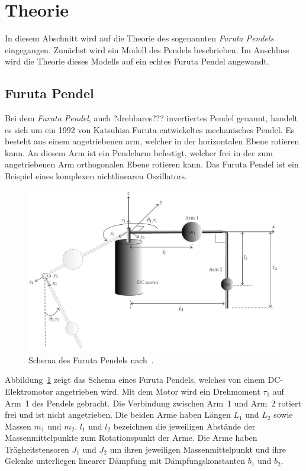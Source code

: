 \section{Theorie}
\label{sec.Theorie}
In diesem Abschnitt wird auf die Theorie des sogenannten \emph{Furuta Pendels} eingegangen. Zunächst wird ein Modell des Pendels beschrieben. Im Anschluss wird die Theorie dieses Modells auf ein echtes Furuta Pendel angewandt. %

\subsection{Furuta Pendel}
\label{sub.Furuta-Pendel}
Bei dem \emph{Furuta Pendel}, auch ?drehbares??? invertiertes Pendel genannt, handelt es sich um ein 1992 von Katsuhisa Furuta entwickeltes mechanisches Pendel. 
Es besteht aus einem angetriebenen arm, welcher in der horizontalen Ebene rotieren kann. 
An diesem Arm ist ein Pendelarm befestigt, welcher frei in der zum angetriebenen Arm orthogonalen Ebene rotieren kann. 
Das Furuta Pendel ist ein Beispiel eines komplexen nichtlinearen Oszillators. \citet{Cazzolato.2011}


\begin{figure}[htbp]
	\label{fig.furuta-schematic}
	\centering
	\includegraphics[width=1.\textwidth]{Grafiken/furuta3.jpg}
	\caption{Schema des Furuta Pendels nach~\cite{Cazzolato.2011}. }
\end{figure}

Abbildung~\ref{fig.furuta-schematic} zeigt das Schema eines Furuta Pendels, welches von einem DC-Elektromotor angetrieben wird.
Mit dem Motor wird ein Drehmoment $\tau_1$ auf Arm~1 des Pendels gebracht. %
Die Verbindung zwischen Arm~1 und Arm~2 rotiert frei und ist nicht angetrieben.
Die beiden Arme haben Längen $L_1$ und $L_2$ sowie Massen $m_1$ und $m_2$.
$l_1$ und $l_2$ bezeichnen die jeweiligen Abstände der Massenmittelpunkte zum Rotationspunkt der Arme.
Die Arme haben Trägheitstensoren $J_1$ und $J_2$ um ihren jeweiligen Massenmittelpunkt und ihre Gelenke unterliegen linearer Dämpfung mit Dämpfungskonstanten $b_1$ und $b_2$.

